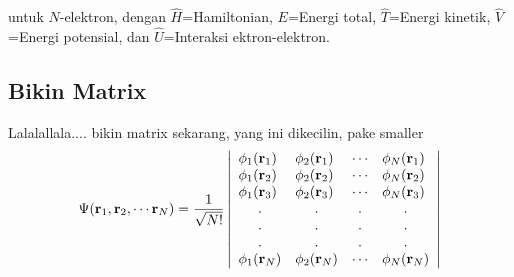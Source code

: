 untuk $N$-elektron, dengan $\hat{H}$=Hamiltonian, $E$=Energi total, $\hat{T}$=Energi kinetik, $\hat{V}$=Energi potensial, dan $\hat{U}$=Interaksi ektron-elektron.

\subsection{Bikin Matrix}
Lalalallala.... bikin matrix sekarang, yang ini dikecilin, pake smaller
	{\smaller
		\begin{equation}
			\Psi({\bf r}_1, {\bf r}_2, \cdots {\bf r}_N) = \frac{1}{\sqrt{N!}}\left| \begin{array}{llcl}
				\phi_1({\bf r}_1)     & \phi_2({\bf r}_1)     & \cdots                & \phi_N({\bf r}_1)     \\
				\phi_1({\bf r}_2)     & \phi_2({\bf r}_2)     & \cdots                & \phi_N({\bf r}_2)     \\
				\phi_1({\bf r}_3)     & \phi_2({\bf r}_3)     & \cdots                & \phi_N({\bf r}_3)     \\
				\multicolumn{1}{c}{.} & \multicolumn{1}{c}{.} & \multicolumn{1}{c}{.} & \multicolumn{1}{c}{.} \\
				\multicolumn{1}{c}{.} & \multicolumn{1}{c}{.} & \multicolumn{1}{c}{.} & \multicolumn{1}{c}{.} \\
				\multicolumn{1}{c}{.} & \multicolumn{1}{c}{.} & \multicolumn{1}{c}{.} & \multicolumn{1}{c}{.} \\
				\phi_1({\bf r}_N)     & \phi_2({\bf r}_N)     & \cdots                & \phi_N({\bf r}_N)     \\
			\end{array} \right|
		\end{equation}
	}